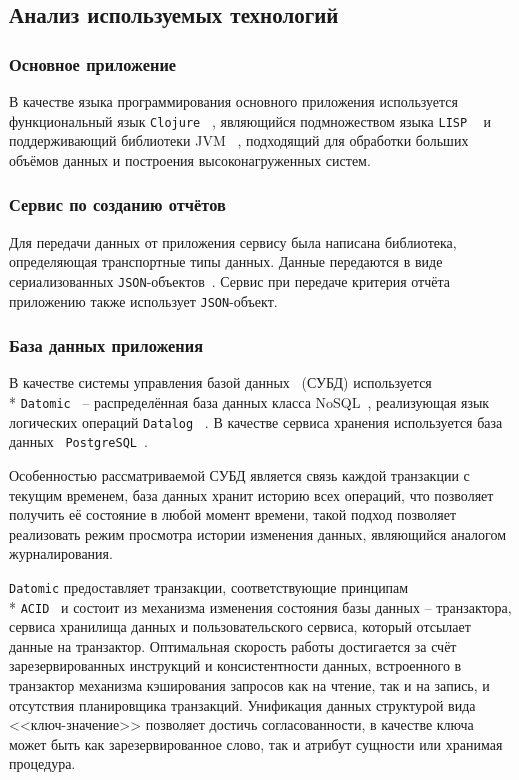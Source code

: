 \subsection{Анализ используемых технологий}

\subsubsection{Основное приложение}

В качестве языка программирования основного приложения используется функциональный язык \texttt{Clojure} ~\cite{clojure}, являющийся подмножеством языка \texttt{LISP} ~\cite{lisp} и поддерживающий библиотеки JVM ~\cite{jvm}, подходящий для обработки больших объёмов данных и построения высоконагруженных систем.

\subsubsection{Сервис по созданию отчётов}


Для передачи данных от приложения сервису была написана библиотека, определяющая транспортные типы данных. Данные передаются в виде сериализованных \texttt{JSON}-объектов~\cite{JSON}. Сервис при передаче критерия отчёта приложению также использует \texttt{JSON}-объект.

\subsubsection{База данных приложения}

В качестве системы управления базой данных~\cite{subd} (СУБД) используется \\* \texttt{Datomic}~\cite{datomic} -- распределённая база данных класса NoSQL~\cite{nosql}, реализующая язык логических операций \texttt{Datalog} ~\cite{datalog}. В качестве сервиса хранения используется база данных~\cite{database} \texttt{PostgreSQL}~\cite{postgresql}.

Особенностью рассматриваемой СУБД является связь каждой транзакции с текущим временем, база данных хранит историю всех операций, что позволяет получить её состояние в любой момент времени, такой подход позволяет реализовать режим просмотра истории изменения данных, являющийся аналогом журналирования.

\texttt{Datomic} предоставляет транзакции, соответствующие принципам \\* \texttt{ACID}~\cite{acid} и состоит из механизма изменения состояния базы данных -- транзактора, сервиса хранилища данных и пользовательского сервиса, который отсылает данные на транзактор. Оптимальная скорость работы достигается за счёт зарезервированных инструкций и консистентности данных, встроенного в транзактор механизма кэширования запросов как на чтение, так и на запись, и отсутствия планировщика транзакций. Унификация данных структурой вида <<ключ-значение>> позволяет достичь согласованности, в качестве ключа может быть как зарезервированное слово, так и атрибут сущности или хранимая процедура.

